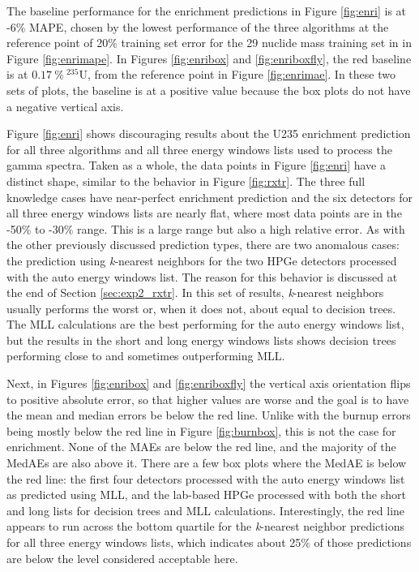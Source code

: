 The baseline performance for the enrichment predictions in Figure
\ref{fig:enri} is at -6\% \gls{MAPE}, chosen by the lowest performance of the
three algorithms at the reference point of 20\% training set error for the 29
nuclide mass training set in in Figure \ref{fig:enrimape}. In Figures
\ref{fig:enribox} and \ref{fig:enriboxfly}, the red baseline is at
$0.17\:\%\:{}^{235}\text{U}$, from the reference point in Figure
\ref{fig:enrimae}.  In these two sets of plots, the baseline is at a positive
value because the box plots do not have a negative vertical axis. 

Figure \ref{fig:enri} shows discouraging results about the \gls{U235}
enrichment prediction for all three algorithms and all three energy windows
lists used to process the gamma spectra.  Taken as a whole, the data points in
Figure \ref{fig:enri} have a distinct shape, similar to the behavior in Figure
\ref{fig:rxtr}.  The three full knowledge cases have near-perfect enrichment
prediction and the six detectors for all three energy windows lists are nearly
flat, where most data points are in the -50\% to -30\% range. This is a large
range but also a high relative error.  As with the other previously discussed
prediction types, there are two anomalous cases: the prediction using
\textit{k}-nearest neighbors for the two \gls{HPGe} detectors processed with
the auto energy windows list. The reason for this behavior is discussed at the
end of Section \ref{sec:exp2_rxtr}. In this set of results, \textit{k}-nearest
neighbors usually performs the worst or, when it does not, about equal to
decision trees. The \gls{MLL} calculations are the best performing for the auto
energy windows list, but the results in the short and long energy windows lists
shows decision trees performing close to and sometimes outperforming \gls{MLL}.

Next, in Figures \ref{fig:enribox} and \ref{fig:enriboxfly} the vertical axis
orientation flips to positive absolute error, so that higher values are worse
and the goal is to have the mean and median errors be below the red line.
Unlike with the burnup errors being mostly below the red line in Figure
\ref{fig:burnbox}, this is not the case for enrichment. None of the \gls{MAE}s
are below the red line, and the majority of the \gls{MedAE}s are also above it.
There are a few box plots where the \gls{MedAE} is below the red line: the
first four detectors processed with the auto energy windows list as predicted
using \gls{MLL}, and the lab-based \gls{HPGe} processed with both the short and
long lists for decision trees and \gls{MLL} calculations.  Interestingly, the
red line appears to run across the bottom quartile for the \textit{k}-nearest
neighbor predictions for all three energy windows lists, which indicates about
25\% of those predictions are below the level considered acceptable here.  

